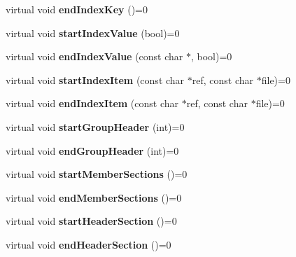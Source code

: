 \begin{DoxyCompactItemize}
virtual void {\bfseries end\+Index\+Key} ()=0
\item 
\mbox{\label{class_output_generator_a8b7df4e8d1c8c35c96ed72a1dd88dfc3}} 
virtual void {\bfseries start\+Index\+Value} (bool)=0
\item 
\mbox{\label{class_output_generator_a197393fc4473bb893a83f36369df1552}} 
virtual void {\bfseries end\+Index\+Value} (const char $\ast$, bool)=0
\item 
\mbox{\label{class_output_generator_afbc31c1a5eaecbcf45e16c4a16d747f7}} 
virtual void {\bfseries start\+Index\+Item} (const char $\ast$ref, const char $\ast$file)=0
\item 
\mbox{\label{class_output_generator_ad573d99d60efb03de6afcec74237b89c}} 
virtual void {\bfseries end\+Index\+Item} (const char $\ast$ref, const char $\ast$file)=0
\item 
\mbox{\label{class_output_generator_a567cedbeeb6ffa8f65893976e4c246d9}} 
virtual void {\bfseries start\+Group\+Header} (int)=0
\item 
\mbox{\label{class_output_generator_a16003f13c40bcbb34bbe04eb13633637}} 
virtual void {\bfseries end\+Group\+Header} (int)=0
\item 
\mbox{\label{class_output_generator_a3dcfbf917012cf7e133f6876750ca29b}} 
virtual void {\bfseries start\+Member\+Sections} ()=0
\item 
\mbox{\label{class_output_generator_a68c7d0afc95708807a5e623a7e9bb9db}} 
virtual void {\bfseries end\+Member\+Sections} ()=0
\item 
\mbox{\label{class_output_generator_a60a86f83cd8878a315820831c66f7e55}} 
virtual void {\bfseries start\+Header\+Section} ()=0
\item 
\mbox{\label{class_output_generator_a0be4290a396c38e39361a1a23f331730}} 
virtual void {\bfseries end\+Header\+Section} ()=0
\item 

\end{DoxyCompactItemize}
